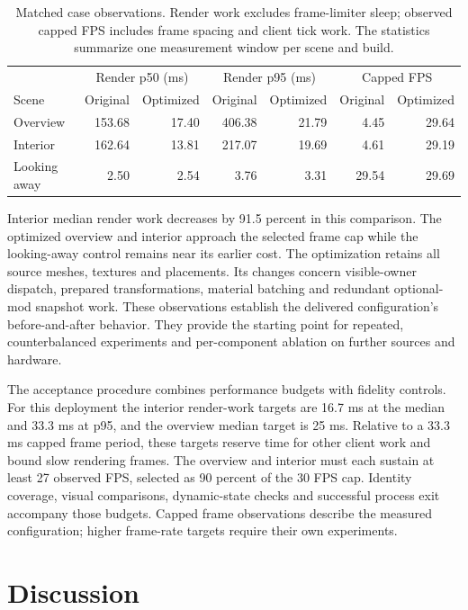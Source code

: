 \documentclass[11pt]{article}
\begin{document}
\begin{table}[t]
\centering\small
\begin{tabular}{lrrrrrr}
\toprule
 & \multicolumn{2}{c}{Render p50 (ms)} & \multicolumn{2}{c}{Render p95 (ms)} & \multicolumn{2}{c}{Capped FPS}\\
Scene & Original & Optimized & Original & Optimized & Original & Optimized\\
\midrule
Overview & 153.68 & 17.40 & 406.38 & 21.79 & 4.45 & 29.64\\
Interior & 162.64 & 13.81 & 217.07 & 19.69 & 4.61 & 29.19\\
Looking away & 2.50 & 2.54 & 3.76 & 3.31 & 29.54 & 29.69\\
\bottomrule
\end{tabular}
\caption{Matched case observations. Render work excludes frame-limiter sleep;
observed capped FPS includes frame spacing and client tick work. The statistics
summarize one measurement window per scene and build.}
\label{tab:performance}
\end{table}

Interior median render work decreases by 91.5 percent in this comparison. The
optimized overview and interior approach the selected frame cap while the
looking-away control remains near its earlier cost. The optimization retains
all source meshes, textures and placements. Its changes concern visible-owner
dispatch, prepared transformations, material batching and redundant optional-mod
snapshot work. These observations establish the delivered configuration's
before-and-after behavior. They provide the starting point for repeated,
counterbalanced experiments and per-component ablation on further sources and
hardware.

The acceptance procedure combines performance budgets with fidelity controls.
For this deployment the interior render-work targets are 16.7 ms at the median
and 33.3 ms at p95, and the overview median target is 25 ms. Relative to a
33.3 ms capped frame period, these targets reserve time for other client work
and bound slow rendering frames. The overview and interior must each sustain
at least 27 observed FPS, selected as 90 percent of the 30 FPS cap.
Identity coverage, visual comparisons, dynamic-state checks and successful
process exit accompany those budgets. Capped frame observations describe the
measured configuration; higher frame-rate targets require their own experiments.

\section{Discussion}
\end{document}
